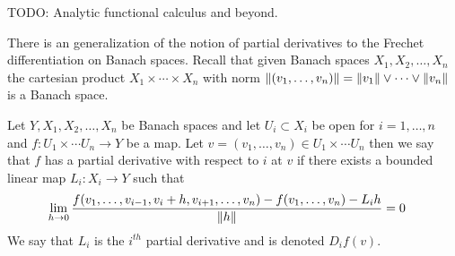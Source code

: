 TODO: Analytic functional calculus and beyond.

There is an generalization of the notion of partial derivatives to the Frechet differentiation on Banach spaces.
Recall that given Banach spaces $X_1, X_2, \dotsc, X_n$ the cartesian product $X_1 \times \dotsb \times X_n$ with norm
$\lVert (v_1, \dotsc, v_n) \rVert = \lVert v_1 \rVert \vee \dotsb \vee \lVert v_n \rVert$ is a Banach space.  
\begin{defn}Let $Y,X_1, X_2, \dotsc, X_n$ be Banach spaces and let $U_i \subset X_i$ be open for $i=1, \dotsc, n$ and $f : U_1 \times \dotsb U_n \to Y$ be a map.  Let 
$v=(v_1, \dotsc, v_n) \in U_1 \times \dotsb U_n$ then we say that $f$ has a partial derivative with respect to $i$ at $v$ if there exists a bounded linear map $L_i : X_i \to Y$ 
such that 
\begin{align*}
\lim_{h \to 0} \frac{f(v_1, \dotsc, v_{i-1}, v_i + h, v_{i+1}, \dotsc, v_n) - f(v_1, \dotsc, v_n) - L_i h}{\lVert h \rVert} &= 0
\end{align*}
We say that $L_i$ is the $i^{th}$ partial derivative and is denoted $D_i f (v)$.
\end{defn}

